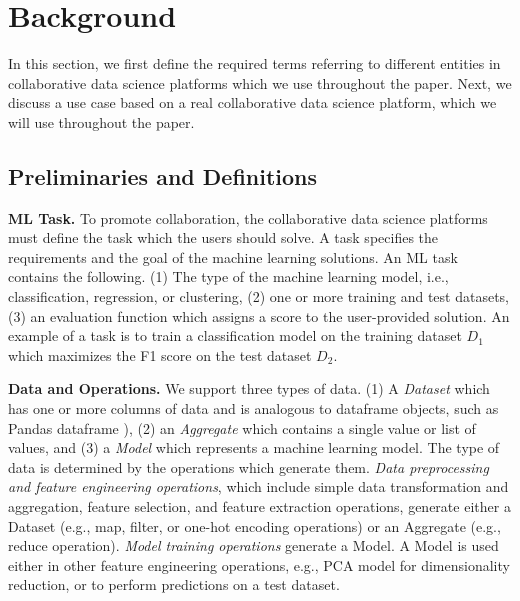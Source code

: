 \section{Background} \label{sec-background}
In this section, we first define the required terms referring to different entities in collaborative data science platforms which we use throughout the paper.
Next, we discuss a use case based on a real collaborative data science platform, which we will use throughout the paper.

\subsection{Preliminaries and Definitions}
\textbf{ML Task.} 
To promote collaboration, the collaborative data science platforms must define the task which the users should solve.
A task specifies the requirements and the goal of the machine learning solutions.
An ML task contains the following.
(1) The type of the machine learning model, i.e., classification, regression, or clustering, (2) one or more training and test datasets, (3) an evaluation function which assigns a score to the user-provided solution.
An example of a task is to train a classification model on the training dataset $D_1$ which maximizes the F1 score on the test dataset $D_2$.

\textbf{Data and Operations.}
We support three types of data.
(1) A \textit{Dataset} which has one or more columns of data and is analogous to dataframe objects, such as Pandas dataframe \cite{mckinney-proc-scipy-2010}), (2) an \textit{Aggregate} which contains a single value or list of values, and (3) a \textit{Model} which represents a machine learning model.
The type of data is determined by the operations which generate them.
\textit{Data preprocessing and feature engineering operations}, which include simple data transformation and aggregation, feature selection, and feature extraction operations, generate either a Dataset (e.g., map, filter, or one-hot encoding operations)  or an Aggregate (e.g., reduce operation).
\textit{Model training operations} generate a Model.
A Model is used either in other feature engineering operations, e.g., PCA model for dimensionality reduction, or to perform predictions on a test dataset.
 
